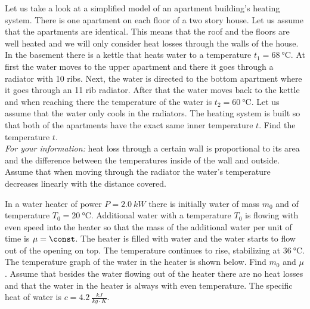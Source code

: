 \documentclass[11pt]{article}
\begin{document}
\probeng
Let us take a look at a simplified model of an apartment building’s heating system. There is one apartment on each floor of a two story house. Let us assume that the apartments are identical. This means that the roof and the floors are well heated and we will only consider heat losses through the walls of the house.\\
In the basement there is a kettle that heats water to a temperature $t_1=\SI{68}{\degreeCelsius}$. At first the water moves to the upper apartment and there it goes through a radiator with 10 ribs. Next, the water is directed to the bottom apartment where it goes through an 11 rib radiator. After that the water moves back to the kettle and when reaching there the temperature of the water is $t_2=\SI{60}{\degreeCelsius}$. Let us assume that the water only cools in the radiators. The heating system is built so that both of the apartments have the exact same inner temperature $t$. Find the temperature $t$. \\
\emph{For your information:} heat loss through a certain wall is proportional to its area and the difference between the temperatures inside of the wall and outside. Assume that when moving through the radiator the water’s temperature decreases linearly with the distance covered.
\probend
\bigskip


\probeng
In a water heater of power $P=\SI{2.0}{kW}$ there is initially water of mass $m_0$ and of temperature $T_0=\SI{20}{\degreeCelsius}$. Additional water with a temperature $T_0$ is flowing with even speed into the heater so that the mass of the additional water per unit of time is $\mu=\const$. The heater is filled with water and the water starts to flow out of the opening on top. The temperature continues to rise, stabilizing at $\SI{36}{\degreeCelsius}$. The temperature graph of the water in the heater is shown below. Find $m_0$ and $\mu$. Assume that besides the water flowing out of the heater there are no heat losses and that the water in the heater is always with even temperature. The specific heat of water is $c=\SI{4.2}{\frac{kJ}{kg\cdot K}}$.\\
\probend
\bigskip
\end{document}
